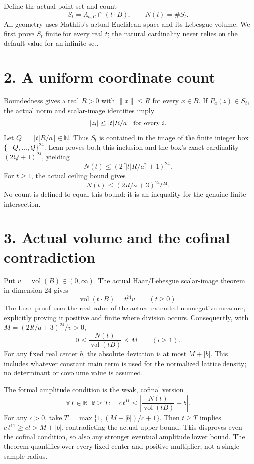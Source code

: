 \documentclass[10pt]{article}
\begin{document}
Define the actual point set and count
\[
 S_t=\Lambda_{a,C}\cap(t\cdot B),\qquad N(t)=\#S_t.
\]
All geometry uses Mathlib's actual Euclidean space and its Lebesgue volume. We first prove $S_t$ finite for every real $t$; the natural cardinality never relies on the default value for an infinite set.

\section*{2. A uniform coordinate count}
Boundedness gives a real $R>0$ with $\|x\|\le R$ for every $x\in B$. If $P_a(z)\in S_t$, the actual norm and scalar-image identities imply
\[
 |z_i|\le |t|R/a\quad\hbox{for every }i.
\]
Let $Q=\lceil |t|R/a\rceil\in\mathbb N$. Thus $S_t$ is contained in the image of the finite integer box $\{-Q,\ldots,Q\}^{24}$. Lean proves both this inclusion and the box's exact cardinality $(2Q+1)^{24}$, yielding
\[
 N(t)\le(2\lceil |t|R/a\rceil+1)^{24}.
\]
For $t\ge1$, the actual ceiling bound gives
\[
 N(t)\le(2R/a+3)^{24}t^{24}.
\]
No count is defined to equal this bound: it is an inequality for the genuine finite intersection.

\section*{3. Actual volume and the cofinal contradiction}
Put $v=\operatorname{vol}(B)\in(0,\infty)$. The actual Haar/Lebesgue scalar-image theorem in dimension $24$ gives
\[
 \operatorname{vol}(t\cdot B)=t^{24}v\qquad(t\ge0).
\]
The Lean proof uses the real value of the actual extended-nonnegative measure, explicitly proving it positive and finite where division occurs. Consequently, with $M=(2R/a+3)^{24}/v>0$,
\[
 0\le\frac{N(t)}{\operatorname{vol}(tB)}\le M\qquad(t\ge1).
\]
For any fixed real center $b$, the absolute deviation is at most $M+|b|$. This includes whatever constant main term is used for the normalized lattice density; no determinant or covolume value is assumed.

The formal amplitude condition is the weak, cofinal version
\[
 \forall T\in\mathbb R\ \exists t\ge T:\quad
 c\,t^{11}\le\left|\frac{N(t)}{\operatorname{vol}(tB)}-b\right|.
\]
For any $c>0$, take $T=\max\{1,(M+|b|)/c+1\}$. Then $t\ge T$ implies $c\,t^{11}\ge ct>M+|b|$, contradicting the actual upper bound. This disproves even the cofinal condition, so also any stronger eventual amplitude lower bound. The theorem quantifies over every fixed center and positive multiplier, not a single sample radius.
\end{document}
